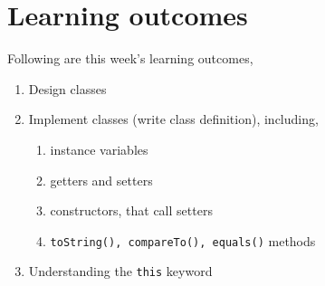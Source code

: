 
\section*{Learning outcomes}
Following are this week's learning outcomes,
\begin{enumerate}
\item Design classes
\item Implement classes (write class definition), including,
	\begin{enumerate}
		\item instance variables
		\item getters and setters
		\item constructors, that call setters
		\item \texttt{toString(), compareTo(), equals()} methods
	\end{enumerate}
\item Understanding the \texttt{this} keyword
\end{enumerate}

